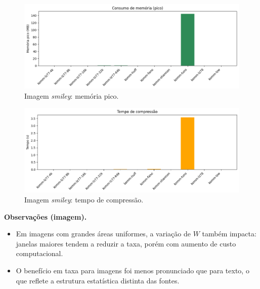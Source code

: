 \begin{figure}[htp]
  \centering
  \caption{Imagem \textit{smiley}: memória pico.}
  \label{fig:komm-smiley-memory}
  \includegraphics[width=15cm]{figuras/komm_smiley_memory.png}
\end{figure}

\begin{figure}[htp]
  \centering
  \caption{Imagem \textit{smiley}: tempo de compressão.}
  \label{fig:komm-smiley-time}
  \includegraphics[width=15cm]{figuras/komm_smiley_time.png}
\end{figure}

\noindent\textbf{Observações (imagem).}
\begin{itemize}
  \item Em imagens com grandes áreas uniformes, a variação de \(W\) também impacta: janelas maiores tendem a reduzir a taxa, porém com aumento de custo computacional.
  \item O benefício em taxa para imagens foi menos pronunciado que para texto, o que reflete a estrutura estatística distinta das fontes.
\end{itemize}

